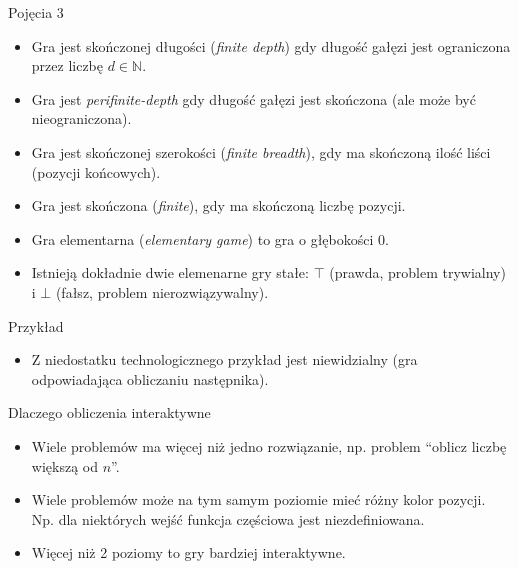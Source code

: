 \documentclass{beamer}
\begin{document}
\begin{frame}{Pojęcia 3}
\begin{itemize}
	\item Gra jest skończonej długości (\textit{finite depth}) gdy długość gałęzi jest ograniczona przez liczbę $d \in \mathbb{N}$.
	\item Gra jest \textit{perifinite-depth} gdy długość gałęzi jest skończona (ale może być nieograniczona).
	\item Gra jest skończonej szerokości (\textit{finite breadth}), gdy ma skończoną ilość liści (pozycji końcowych).
	\item Gra jest skończona (\textit{finite}), gdy ma skończoną liczbę pozycji.
	\item Gra elementarna (\textit{elementary game}) to gra o głębokości 0.
	\item Istnieją dokładnie dwie elemenarne gry stałe: $\top$ (prawda, problem trywialny) i $\bot$ (fałsz, problem nierozwiązywalny).
\end{itemize}
\end{frame}

\begin{frame}{Przykład}
\begin{itemize}
	\item Z niedostatku technologicznego przykład jest niewidzialny (gra odpowiadająca obliczaniu następnika).
\end{itemize}
\end{frame}

\begin{frame}{Dlaczego obliczenia interaktywne}
\begin{itemize}
	\item Wiele problemów ma więcej niż jedno rozwiązanie, np. problem ``oblicz liczbę większą od $n$''.
	\item Wiele problemów może na tym samym poziomie mieć różny kolor pozycji. Np. dla niektórych wejść funkcja częściowa jest niezdefiniowana.
	\item Więcej niż 2 poziomy to gry bardziej interaktywne.
\end{itemize}
\end{frame}
\end{document}
